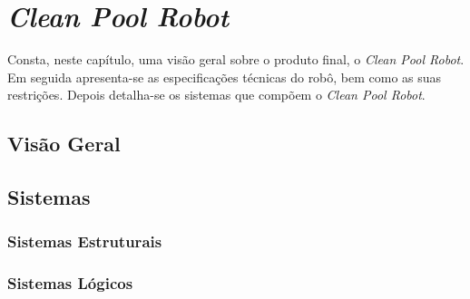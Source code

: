 \chapter{\textit{Clean Pool Robot}}
Consta, neste capítulo, uma visão geral sobre o produto final, o
\textit{Clean Pool Robot}. Em seguida apresenta-se as especificações técnicas
do robô, bem como as suas restrições. Depois detalha-se os sistemas que compõem
o \textit{Clean Pool Robot}.

\section{Visão Geral}
\section{Sistemas}
\subsection{Sistemas Estruturais}
\subsection{Sistemas Lógicos}